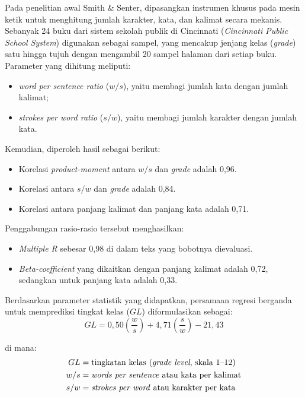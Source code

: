 Pada penelitian awal Smith \& Senter, dipasangkan instrumen khusus pada mesin ketik untuk menghitung jumlah karakter, kata, dan kalimat secara mekanis. Sebanyak 24 buku dari sistem sekolah publik di Cincinnati (\textit{Cincinnati Public School System}) digunakan sebagai sampel, yang mencakup jenjang kelas (\textit{grade}) satu hingga tujuh dengan mengambil 20 sampel halaman dari setiap buku. Parameter yang dihitung meliputi:
\begin{itemize}
    \item \textit{word per sentence ratio} ($w/s$), yaitu membagi jumlah kata dengan jumlah kalimat;
    \item \textit{strokes per word ratio} ($s/w$), yaitu membagi jumlah karakter dengan jumlah kata.
\end{itemize}
Kemudian, diperoleh hasil sebagai berikut:
\begin{itemize}
    \item Korelasi \textit{product-moment} antara $w/s$ dan \textit{grade} adalah 0,96.
    \item Korelasi antara $s/w$ dan \textit{grade} adalah 0,84.
    \item Korelasi antara panjang kalimat dan panjang kata adalah 0,71.
\end{itemize}
Penggabungan rasio-rasio tersebut menghasilkan:
\begin{itemize}
    \item \textit{Multiple R} sebesar 0,98 di dalam teks yang bobotnya dievaluasi.
    \item \textit{Beta-coefficient} yang dikaitkan dengan panjang kalimat adalah 0,72, sedangkan untuk panjang kata adalah 0,33.
\end{itemize}
Berdasarkan parameter statistik yang didapatkan, persamaan regresi berganda untuk memprediksi tingkat kelas ($GL$) diformulasikan sebagai:
\begin{equation}
GL = 0{,}50\left(\frac{w}{s}\right)
   + 4{,}71\left(\frac{s}{w}\right)
   - 21{,}43
\end{equation}

di mana:
    \begin{align*}
    GL &= \text{tingkatan kelas (\textit{grade level}, skala 1--12)} \\
    w/s &= \text{\textit{words per sentence} atau kata per kalimat} \\
    s/w &= \text{\textit{strokes per word} atau karakter per kata}
    \end{align*}
    
